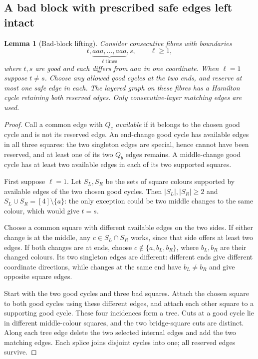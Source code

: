 \documentclass[11pt]{article}
\newtheorem{lemma}[theorem]{Lemma}
\theoremstyle{remark}
\numberwithin{equation}{section}
\numberwithin{table}{section}
\begin{document}
\subsection{A bad block with prescribed safe edges left intact}
\begin{lemma}[Bad-block lifting]\label{lem:badblock}
Consider consecutive fibres with boundaries
\[
             t,\underbrace{aaa,\ldots,aaa}_{\ell\text{ times}},s,
             \qquad \ell\ge1,
\]
where $t,s$ are good and each differs from $aaa$ in one coordinate.
When $\ell=1$ suppose $t\ne s$. Choose any allowed good cycles at
the two ends, and reserve at most one safe edge in each. The layered
graph on these fibres has a Hamilton cycle retaining both reserved
edges. Only consecutive-layer matching edges are used.
\end{lemma}
\begin{proof}
Call a common edge with $Q_c$ \emph{available} if it belongs to the
chosen good cycle and is not its reserved edge. An end-change good
cycle has available edges in all three squares: the two singleton
edges are special, hence cannot have been reserved, and at least one
of its two $Q_b$ edges remains. A middle-change good cycle has at least
two available edges in each of its two supported squares.

First suppose $\ell=1$. Let $S_L,S_R$ be the sets of square
colours supported by available edges of the two chosen good cycles.
Then $|S_L|,|S_R|\ge2$ and $S_L\cup S_R=[4]\setminus\{a\}$:
the only exception could be two middle changes to the same colour,
which would give $t=s$.

Choose a common square with different available edges on the two
sides. If either change is at the middle, any $c\in S_L\cap S_R$
works, since that side offers at least two edges. If both changes
are at ends, choose $c\notin\{a,b_L,b_R\}$, where $b_L,b_R$ are
their changed colours. Its two singleton edges are different:
different ends give different coordinate directions, while changes
at the same end have $b_L\ne b_R$ and give opposite square edges.

Start with the two good cycles and three bad squares. Attach the
chosen square to both good cycles using these different edges, and
attach each other square to a supporting good cycle. These four
incidences form a tree. Cuts at a good cycle lie in different
middle-colour squares, and the two bridge-square cuts are distinct.
Along each tree edge delete the two selected internal edges and add
the two matching edges. Each splice joins disjoint cycles into one;
all reserved edges survive.


\end{proof}
\end{document}
